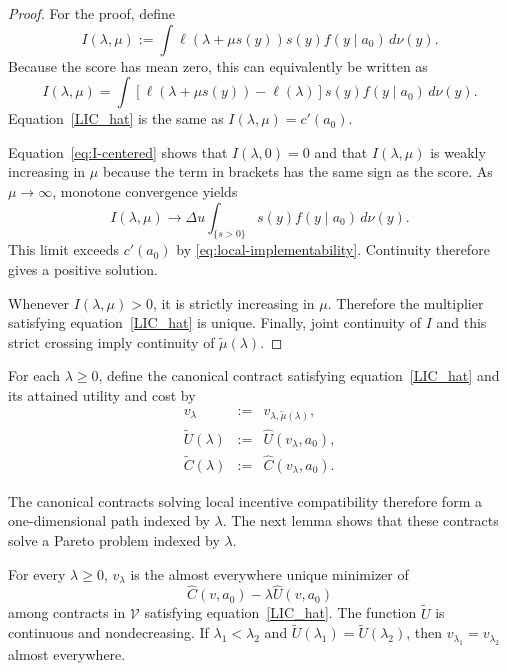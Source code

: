 \begin{proof}
For the proof, define
\[
    I(\lambda,\mu)
    :=\int \ell(\lambda+\mu s(y))s(y)f(y\mid a_0)\,d\nu(y).
\]
Because the score has mean zero, this can equivalently be written as
\begin{equation}
 I(\lambda,\mu)
 =\int[\ell(\lambda+\mu s(y))-\ell(\lambda)]s(y)
 f(y\mid a_0)\,d\nu(y).
 \label{eq:I-centered}
\end{equation}
Equation~\eqref{LIC_hat} is the same as $I(\lambda,\mu)=c'(a_0)$.

Equation~\eqref{eq:I-centered} shows that $I(\lambda,0)=0$ and that
$I(\lambda,\mu)$ is weakly increasing in $\mu$ because the term in brackets has the same sign as the score.  As $\mu\to\infty$,
monotone convergence yields
\[
 I(\lambda,\mu)\longrightarrow
 \Delta u\int_{\{s>0\}}s(y)f(y\mid a_0)\,d\nu(y).
\]
This limit exceeds $c'(a_0)$ by
\eqref{eq:local-implementability}.  Continuity therefore gives a positive
solution.

Whenever $I(\lambda,\mu)>0$, it is strictly increasing in $\mu$.
Therefore the multiplier satisfying equation~\eqref{LIC_hat} is unique.  Finally, joint continuity
of $I$ and this strict crossing imply continuity of
$\widetilde\mu(\lambda)$.
\end{proof}

For each $\lambda\geq0$, define the canonical contract satisfying equation~\eqref{LIC_hat} and its attained utility and cost by
\begin{eqnarray*}
    v_\lambda&:=&v_{\lambda,\widetilde\mu(\lambda)},\\
    \widetilde U(\lambda)&:=&\widehat U(v_\lambda,a_0),\\
    \widetilde C(\lambda)&:=&\widehat C(v_\lambda,a_0).
\end{eqnarray*}

The canonical contracts solving local incentive compatibility therefore form a one-dimensional path indexed by
$\lambda$.  The next lemma shows that these contracts solve a Pareto problem indexed by $\lambda$.

\begin{lemma}
\label{lem:pareto-problem}
For every $\lambda\geq0$, $v_\lambda$ is the almost everywhere unique
minimizer of
\[
    \widehat C(v,a_0)-\lambda\widehat U(v,a_0)
\]
among contracts in $\mathcal V$ satisfying equation~\eqref{LIC_hat}.  The function
$\widetilde U$ is
continuous and nondecreasing.  If $\lambda_1<\lambda_2$ and
$\widetilde U(\lambda_1)=\widetilde U(\lambda_2)$, then
$v_{\lambda_1}=v_{\lambda_2}$ almost everywhere.
\end{lemma}

